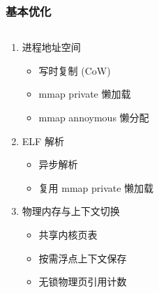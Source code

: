 \begin{frame}
    \frametitle{基本优化}
    \begin{columns}
        \begin{column}{.5\linewidth}
            \begin{enumerate}
                \item 进程地址空间
                      \begin{itemize}
                          \item 写时复制 (CoW)
                          \item mmap private 懒加载
                          \item mmap annoymous 懒分配
                      \end{itemize}
                \item ELF 解析
                      \begin{itemize}
                          \item 异步解析
                          \item 复用 mmap private 懒加载
                      \end{itemize}
                \item 物理内存与上下文切换
                      \begin{itemize}
                          \item 共享内核页表
                          \item 按需浮点上下文保存
                          \item 无锁物理页引用计数
                      \end{itemize}
            \end{enumerate}
        \end{column}


\end{columns}
\end{frame}
